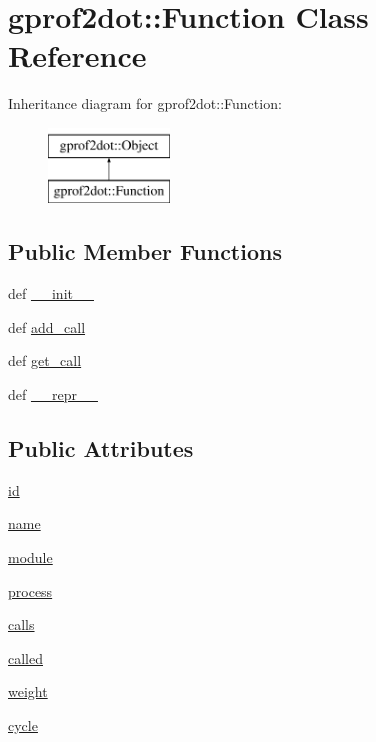 \hypertarget{classgprof2dot_1_1Function}{
\section{gprof2dot::Function Class Reference}
\label{classgprof2dot_1_1Function}
}
Inheritance diagram for gprof2dot::Function:\begin{figure}[H]
\begin{center}
\leavevmode
\includegraphics[height=2.000000cm]{classgprof2dot_1_1Function}
\end{center}
\end{figure}
\subsection*{Public Member Functions}
\begin{DoxyCompactItemize}
\item 
def \hyperlink{classgprof2dot_1_1Function_a07309fed1a380e4e2d5715ce4c23f85d}{\_\-\_\-init\_\-\_\-}
\item 
def \hyperlink{classgprof2dot_1_1Function_a7c42628f5fa968e69950cd824daaee53}{add\_\-call}
\item 
def \hyperlink{classgprof2dot_1_1Function_a558d9eb243fd4038571aafefe2b0f2b7}{get\_\-call}
\item 
def \hyperlink{classgprof2dot_1_1Function_a54189eccb9fa937a3740b0a26b01819d}{\_\-\_\-repr\_\-\_\-}
\end{DoxyCompactItemize}
\subsection*{Public Attributes}
\begin{DoxyCompactItemize}
\item 
\hyperlink{classgprof2dot_1_1Function_af94d9542ce8310c4411e8b582799b62c}{id}
\item 
\hyperlink{classgprof2dot_1_1Function_a1a48dee1b5120d74751d874429e539eb}{name}
\item 
\hyperlink{classgprof2dot_1_1Function_aa25a58d197676ff91617109539440b0f}{module}
\item 
\hyperlink{classgprof2dot_1_1Function_a7a0b3e3634324e0db378b9ba1fd896b3}{process}
\item 
\hyperlink{classgprof2dot_1_1Function_aedaa9fad9c10943cd384cf9258e34727}{calls}
\item 
\hyperlink{classgprof2dot_1_1Function_ada8834d7262abe161268d246af697450}{called}
\item 
\hyperlink{classgprof2dot_1_1Function_ab85bab1adeddba144e8d31d75a3179d9}{weight}
\item 
\hyperlink{classgprof2dot_1_1Function_ad15eca167d57acff8004bd22b5c6fd12}{cycle}
\end{DoxyCompactItemize}


